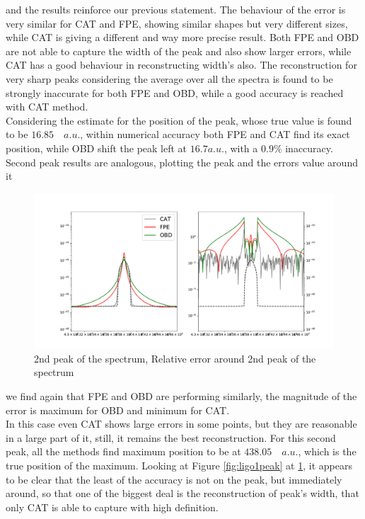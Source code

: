 \documentclass[twocolumn,showpacs,preprintnumbers,nofootinbib,prd,
superscriptaddress,10pt]{revtex4-1}
\begin{document}
and the results reinforce our previous statement. The behaviour of the error is very similar for CAT and FPE, showing similar shapes but very different sizes, while CAT is giving a different and way more precise result. Both FPE and OBD are not able to capture the width of the peak and also show larger errors, while CAT has a good behaviour in reconstructing width's also. 
The reconstruction for very sharp peaks considering the average over all the spectra is found to be strongly inaccurate for both FPE and OBD, while a good accuracy is reached with CAT method. \\ 
Considering the estimate for the position of the peak, whose true value is found to be $16.85 \quad a.u. $, within numerical accuracy both FPE and CAT find its exact position, while OBD shift the peak left at $16.7 a.u.$, with a $0.9\%$ inaccuracy.\\ 
Second peak results are analogous, plotting the peak and the errors value around it
\begin{figure}[t]
    \centering
        \includegraphics[width = \linewidth]{Images/LIGOsimulate/2ndPeakComparison.pdf}
        \caption{2nd peak of the spectrum, Relative error around 2nd peak of the spectrum}
        \label{fig:ligo2peak}
\end{figure}
we find again that FPE and OBD are performing similarly, the magnitude of the error is maximum for OBD and minimum for CAT. \\ 
In this case even CAT shows large errors in some points, but they are reasonable in a large part of it, still, it remains the best reconstruction.  For this second peak, all the methods find maximum position to be at $438.05 \quad a.u.$, which is the true position of the maximum.
Looking at Figure \ref{fig:ligo1peak} at \ref{fig:ligo2peak}, it appears to be clear that the least of the accuracy is not on the peak, but immediately around, so that one of the biggest deal is the reconstruction of peak's width, that only CAT is able to capture with high definition. \\ 
\end{document}

